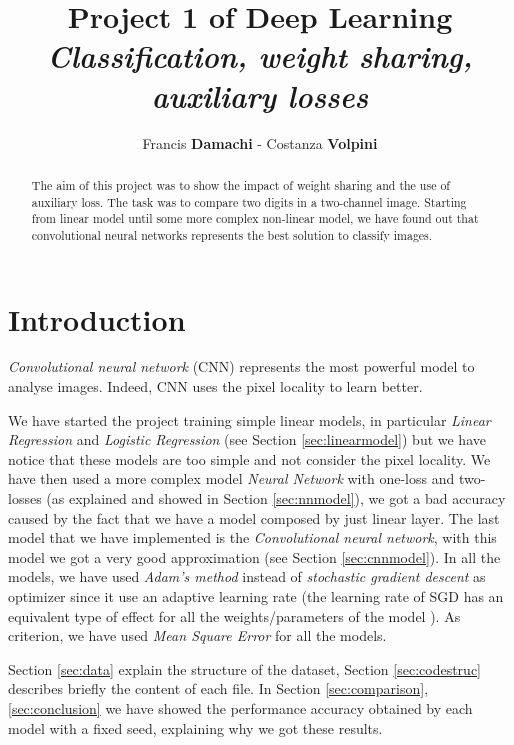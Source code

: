 \documentclass[journal, a4paper]{IEEEtran}
\begin{document}
	\title{Project 1 of Deep Learning\\ \textit{\Large{Classification, weight sharing, auxiliary losses}}}
	\author{Francis \textbf{Damachi} - Costanza \textbf{Volpini}}
	\maketitle
	
\begin{abstract}
The aim of this project was to show the impact of weight sharing and the use of auxiliary loss. The task was to compare two digits in a two-channel image. Starting from linear model until some more complex non-linear model, we have found out that convolutional neural networks represents the best solution to classify images.
\end{abstract}

\section{Introduction}
\label{sec:intro}
\textit{Convolutional neural network} (CNN) represents the most powerful model to analyse images. Indeed, CNN uses the pixel locality to learn better. 

We have started the project training simple linear models, in particular \textit{Linear Regression} and \textit{Logistic Regression} (see Section \ref{sec:linearmodel}) but we have notice that these models are too simple and not consider the pixel locality. We have then used a more complex model \textit{Neural Network} with one-loss and two-losses (as explained and showed in Section \ref{sec:nnmodel}), we got a bad accuracy caused by the fact that we have a model composed by just linear layer. The last model that we have implemented is the \textit{Convolutional neural network}, with this model we got a very good approximation (see Section \ref{sec:cnnmodel}).
In all the models, we have used \textit{Adam's method} instead of \textit{stochastic gradient descent} as optimizer since it use an adaptive learning rate (the learning rate of SGD has an equivalent type of effect for all the weights/parameters of the model \cite{reference0}).
As criterion, we have used \textit{Mean Square Error} for all the models.


Section \ref{sec:data} explain the structure of the dataset, Section \ref{sec:codestruc} describes briefly the content of each file. In Section \ref{sec:comparison}, \ref{sec:conclusion} we have showed the performance accuracy obtained by each model with a fixed seed, explaining why we got these results.
\end{document}
